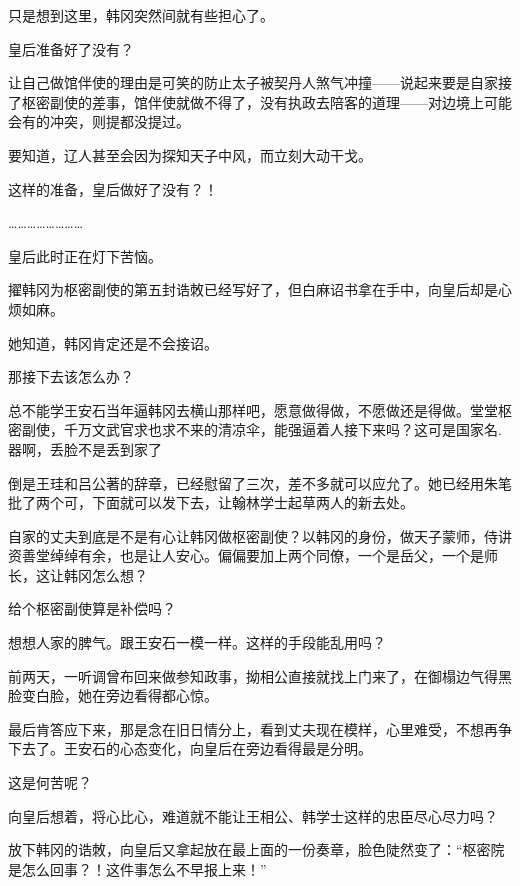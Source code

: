 只是想到这里，韩冈突然间就有些担心了。

皇后准备好了没有？

让自己做馆伴使的理由是可笑的防止太子被契丹人煞气冲撞——说起来要是自家接了枢密副使的差事，馆伴使就做不得了，没有执政去陪客的道理——对边境上可能会有的冲突，则提都没提过。

要知道，辽人甚至会因为探知天子中风，而立刻大动干戈。

这样的准备，皇后做好了没有？！

……………………

皇后此时正在灯下苦恼。

擢韩冈为枢密副使的第五封诰敇已经写好了，但白麻诏书拿在手中，向皇后却是心烦如麻。

她知道，韩冈肯定还是不会接诏。

那接下去该怎么办？

总不能学王安石当年逼韩冈去横山那样吧，愿意做得做，不愿做还是得做。堂堂枢密副使，千万文武官求也求不来的清凉伞，能强逼着人接下来吗？这可是国家名.器啊，丢脸不是丢到家了

倒是王珪和吕公著的辞章，已经慰留了三次，差不多就可以应允了。她已经用朱笔批了两个可，下面就可以发下去，让翰林学士起草两人的新去处。

自家的丈夫到底是不是有心让韩冈做枢密副使？以韩冈的身份，做天子蒙师，侍讲资善堂绰绰有余，也是让人安心。偏偏要加上两个同僚，一个是岳父，一个是师长，这让韩冈怎么想？

给个枢密副使算是补偿吗？

想想人家的脾气。跟王安石一模一样。这样的手段能乱用吗？

前两天，一听调曾布回来做参知政事，拗相公直接就找上门来了，在御榻边气得黑脸变白脸，她在旁边看得都心惊。

最后肯答应下来，那是念在旧日情分上，看到丈夫现在模样，心里难受，不想再争下去了。王安石的心态变化，向皇后在旁边看得最是分明。

这是何苦呢？

向皇后想着，将心比心，难道就不能让王相公、韩学士这样的忠臣尽心尽力吗？

放下韩冈的诰敇，向皇后又拿起放在最上面的一份奏章，脸色陡然变了：“枢密院是怎么回事？！这件事怎么不早报上来！”

